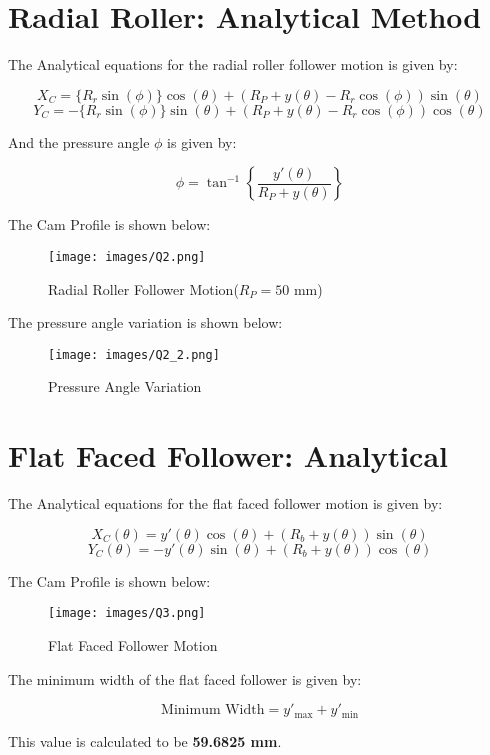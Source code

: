 \documentclass[12pt]{article}
\begin{document}
\section{Radial Roller: Analytical Method}

The Analytical equations for the radial roller follower motion is given by:

$$X_{C} = \{R_r \sin(\phi)\}\cos(\theta) + (R_P + y(\theta) - R_r \cos(\phi))\sin(\theta)$$
$$Y_{C} = -\{R_r \sin(\phi)\}\sin(\theta) + (R_P + y(\theta) - R_r \cos(\phi))\cos(\theta)$$

And the pressure angle $\phi$ is given by:

$$\phi = \tan^{-1}\left \{ \frac{y'(\theta)}{R_P + y(\theta)}\right \}$$

The Cam Profile is shown below:

\begin{figure}[H]
    \centering
    \texttt{[image: images/Q2.png]}
    \caption{Radial Roller Follower Motion($R_P = 50 \text{ mm}$)}
\end{figure}

The pressure angle variation is shown below:

\begin{figure}[H]
    \centering
    \texttt{[image: images/Q2\_2.png]}
    \caption{Pressure Angle Variation}
\end{figure}

\section{Flat Faced Follower: Analytical}

The Analytical equations for the flat faced follower motion is given by:

$$X_C(\theta) = y'(\theta)\cos(\theta) + (R_b + y(\theta))\sin(\theta)$$
$$Y_C(\theta) = -y'(\theta)\sin(\theta) + (R_b + y(\theta))\cos(\theta)$$

The Cam Profile is shown below:

\begin{figure}[H]
    \centering
    \texttt{[image: images/Q3.png]}
    \caption{Flat Faced Follower Motion}
\end{figure}

The minimum width of the flat faced follower is given by:

$$\text{Minimum Width} = y'_\text{max} + y'_\text{min}$$

This value is calculated to be \textbf{59.6825 mm}.
\end{document}
